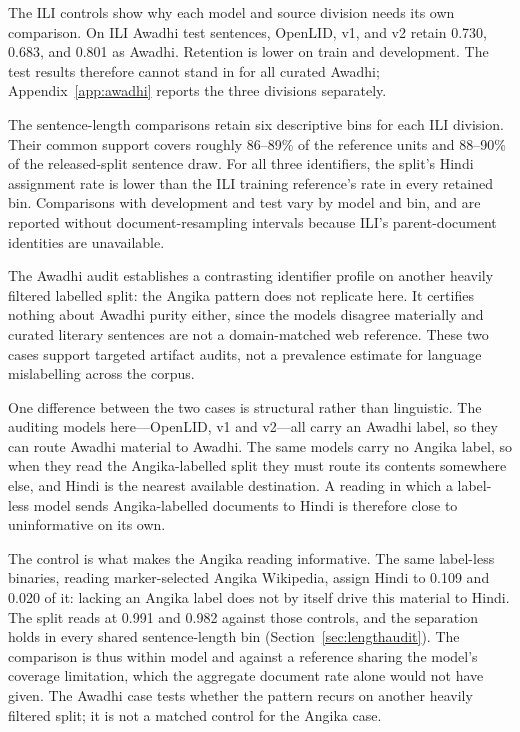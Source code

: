 \documentclass[final]{clv2025}
\newcommand{\fitexhibit}[1]{\sbox{\exhibitbox}{}\ifdim\wd\exhibitbox>\linewidth\resizebox{\linewidth}{!}{\usebox{\exhibitbox}}\else\usebox{\exhibitbox}\fi}
\newcommand{\exhibit}[1]{\fitexhibit{tables/#1.tex}}
\begin{document}
\begin{table}[tb]
\centering\small
\exhibit{awadhi_audit}
\caption{Assignments on the released Awadhi-labelled split. Each model is reported separately; Hindi and Awadhi shares need not sum to one because other labels are possible. Document figures enumerate the entire training shard. Sentence figures describe the fixed 50,000-sentence draw after segmentation and filtering.}
\label{tab:awadhi}
\end{table}

The ILI controls show why each model and source division needs its own comparison. On ILI Awadhi test sentences, OpenLID, v1, and v2 retain 0.730, 0.683, and 0.801 as Awadhi. Retention is lower on train and development. The test results therefore cannot stand in for all curated Awadhi; Appendix~\ref{app:awadhi} reports the three divisions separately.

The sentence-length comparisons retain six descriptive bins for each ILI division. Their common support covers roughly 86--89\% of the reference units and 88--90\% of the released-split sentence draw. For all three identifiers, the split's Hindi assignment rate is lower than the ILI training reference's rate in every retained bin. Comparisons with development and test vary by model and bin, and are reported without document-resampling intervals because ILI's parent-document identities are unavailable.

The Awadhi audit establishes a contrasting identifier profile on another heavily filtered labelled split: the Angika pattern does not replicate here. It certifies nothing about Awadhi purity either, since the models disagree materially and curated literary sentences are not a domain-matched web reference. These two cases support targeted artifact audits, not a prevalence estimate for language mislabelling across the corpus.

One difference between the two cases is structural rather than linguistic. The auditing models here---OpenLID, v1 and v2---all carry an Awadhi label, so they can route Awadhi material to Awadhi. The same models carry no Angika label, so when they read the Angika-labelled split they must route its contents somewhere else, and Hindi is the nearest available destination. A reading in which a label-less model sends Angika-labelled documents to Hindi is therefore close to uninformative on its own.

The control is what makes the Angika reading informative. The same label-less binaries, reading marker-selected Angika Wikipedia, assign Hindi to 0.109 and 0.020 of it: lacking an Angika label does not by itself drive this material to Hindi. The split reads at 0.991 and 0.982 against those controls, and the separation holds in every shared sentence-length bin (Section~\ref{sec:lengthaudit}). The comparison is thus within model and against a reference sharing the model's coverage limitation, which the aggregate document rate alone would not have given. The Awadhi case tests whether the pattern recurs on another heavily filtered split; it is not a matched control for the Angika case.
\end{document}
